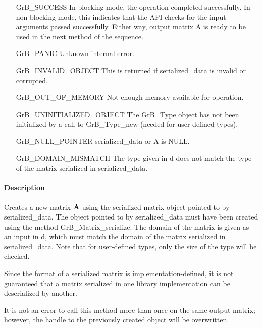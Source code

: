\begin{itemize}[leftmargin=2.3in]
    \item[{\sf GrB\_SUCCESS}]         In blocking mode, the operation completed
    successfully. In non-blocking mode, this indicates that the API checks 
    for the input arguments passed successfully. Either way, output matrix 
    {\sf A} is ready to be used in the next method of the sequence.

    \item[{\sf GrB\_PANIC}]           Unknown internal error.

    \item[{\sf GrB\_INVALID\_OBJECT}]  This is returned if {\sf serialized\_data}
    is invalid or corrupted.
    
    \item[{\sf GrB\_OUT\_OF\_MEMORY}] Not enough memory available for operation.
    
    \item[{\sf GrB\_UNINITIALIZED\_OBJECT}]  The {\sf GrB\_Type} object has not 
    been initialized by a call to {\sf GrB\_Type\_new} (needed for user-defined types).
    
    \item[{\sf GrB\_NULL\_POINTER}]  {\sf serialized\_data} or {\sf A} is {\sf NULL}.

    \item[{\sf GrB\_DOMAIN\_MISMATCH}]  The type given in {\sf d} does not match the type of the matrix serialized in {\sf serialized\_data}. 
\end{itemize}

\paragraph{Description}

Creates a new matrix ${\bf A}$ using the serialized matrix object pointed to
by {\sf serialized\_data}.  The object pointed to by {\sf serialized\_data}
must have been created using the method {\sf GrB\_Matrix\_serialize}.  The domain
of the matrix is given as an input in {\sf d}, which must match the domain of the
matrix serialized in {\sf serialized\_data}.  Note that for user-defined types,
only the size of the type will be checked. 

Since the format of a serialized matrix is implementation-defined, it is not
guaranteed that a matrix serialized in one library implementation can be
deserialized by another.

It is not an error to call this method more than once on the same output matrix;  
however, the handle to the previously created object will be overwritten. 
